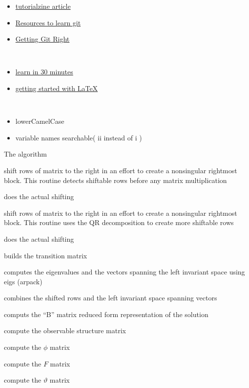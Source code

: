 \documentclass[12pt]{article}
\begin{document}
\begin{description}
  \begin{itemize}
  \item \href{https://tutorialzine.com/2016/06/learn-git-in-30-minutes}{tutorialzine article}
  \item \href{https://try.github.io/}{Resources to learn git}
  \item \href{https://www.atlassian.com/git}{Getting Git Right}
  \end{itemize}

\item[\LaTeX Resources] \ 

  \begin{itemize}
  \item \href{https://www.sharelatex.com/learn/Learn_LaTeX_in_30_minutes}{learn in 30 minutes}
  \item \href{https://www.tug.org/begin.html}{getting started with \LaTeX}
  \end{itemize}
\item[Code] \
  
  \begin{itemize}
  \item lowerCamelCase
  \item variable names searchable( ii instead of i )
  \end{itemize}


\item[AMAalg] The algorithm

\item[exactShift] shift rows of matrix to the right in an effort to create a nonsingular rightmost block. This routine detects shiftable rows before any matrix multiplication
\item[shiftRight]  does the actual shifting 
\item[numericShift] shift rows of matrix to the right in an effort to create a nonsingular rightmost block. This routine uses the QR decomposition to create  more shiftable rows
\item[shiftRight] does the actual shifting 
\item[buildA] builds the transition matrix
\item[eigenSystem] computes the eigenvalues and the vectors spanning the left invariant space using eigs (arpack)
\item[augmentQ] combines the shifted rows and the left invariant space spanning vectors
\item[reducedForm] computs the ``B'' matrix reduced form representation of the solution
\item[observStruct] compute the observable structure matrix
\item[makePhi] compute the $\phi$ matrix
\item[makeF] compute the  $F$ matrix
\item[makeVartheta] compute the  $\vartheta$ matrix



\end{description}
\end{document}
